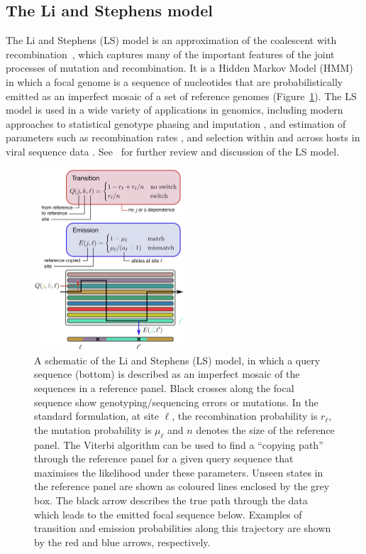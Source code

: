 \documentclass{article}
\begin{document}
\subsection{The Li and Stephens model}
\label{sec:ls}
The Li and Stephens (LS) model \citep{Li2003-ib} is an approximation of the
coalescent with recombination~\citep{Hudson1983-properties}, which captures
many of the important features of the joint processes of mutation and
recombination. It is a Hidden Markov Model (HMM) in which a focal genome is a
sequence of nucleotides that are probabilistically emitted as
an imperfect mosaic of a set of reference genomes
(Figure~\ref{fig:ls_diagram}).
The LS model is used in a wide variety
of applications in genomics, including modern approaches to
statistical genotype phasing and imputation
\citep{Delaneau2019-wl,Browning2021-cg,Browning2018-nk,Rubinacci2020-pa},
and estimation of parameters such as
recombination rates \citep[e.g.][]{Hinch2011-tz},
and selection within and across hosts in viral
sequence data \citep[e.g.][]{Palmer2019-wa}.
See~\cite{Mcvean2019-linkage} for further review and discussion
of the LS model.

\begin{figure} \centering
\includegraphics[width=0.5\textwidth]{figures/ls_diagram_covid.pdf}
\caption{\label{fig:ls_diagram} A schematic of the Li and Stephens (LS)
model, in which a query sequence (bottom) is described as an
imperfect mosaic of the sequences in a reference panel.
Black crosses along the focal sequence show genotyping/sequencing
errors or mutations.
In the standard formulation, at site $\ell$, the recombination probability is $r_\ell$,
the mutation probability is $\mu_\ell$ and $n$
denotes the size of the reference panel.
The Viterbi algorithm can be used to find a
``copying path'' through the reference panel for a given query sequence that
maximises the likelihood under these parameters. Unseen states in the reference panel are shown as coloured lines enclosed by
the grey box. The black arrow describes the true path through the data which leads to the emitted
focal sequence below. Examples of transition and
emission probabilities along this trajectory are shown by the red and blue
arrows, respectively.
}
\end{figure}
\end{document}
